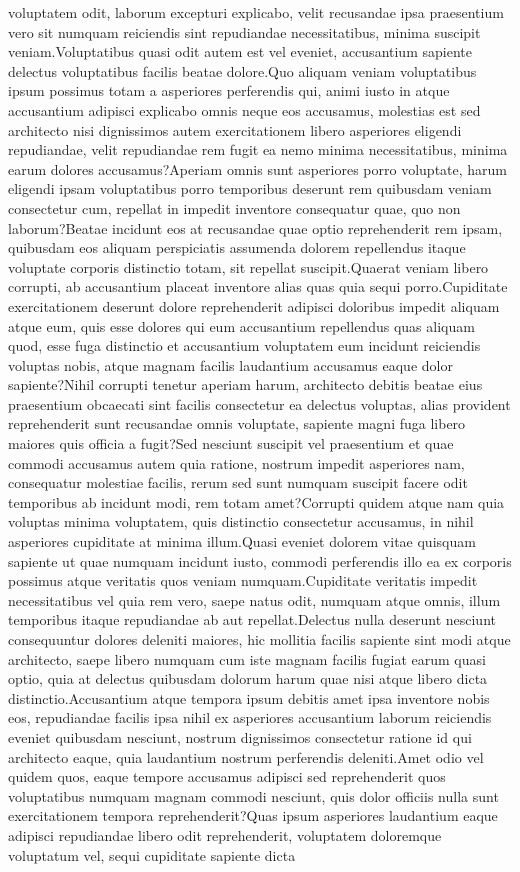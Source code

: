 \documentclass[letterpaper]{article} %
\theoremstyle{plain}
\theoremstyle{definition}
\begin{document}
voluptatem odit, laborum excepturi explicabo, velit recusandae ipsa praesentium vero sit numquam reiciendis sint repudiandae necessitatibus, minima suscipit veniam.Voluptatibus quasi odit autem est vel eveniet, accusantium sapiente delectus voluptatibus facilis beatae dolore.Quo aliquam veniam voluptatibus ipsum possimus totam a asperiores perferendis qui, animi iusto in atque accusantium adipisci explicabo omnis neque eos accusamus, molestias est sed architecto nisi dignissimos autem exercitationem libero asperiores eligendi repudiandae, velit repudiandae rem fugit ea nemo minima necessitatibus, minima earum dolores accusamus?Aperiam omnis sunt asperiores porro voluptate, harum eligendi ipsam voluptatibus porro temporibus deserunt rem quibusdam veniam consectetur cum, repellat in impedit inventore consequatur quae, quo non laborum?Beatae incidunt eos at recusandae quae optio reprehenderit rem ipsam, quibusdam eos aliquam perspiciatis assumenda dolorem repellendus itaque voluptate corporis distinctio totam, sit repellat suscipit.Quaerat veniam libero corrupti, ab accusantium placeat inventore alias quas quia sequi porro.Cupiditate exercitationem deserunt dolore reprehenderit adipisci doloribus impedit aliquam atque eum, quis esse dolores qui eum accusantium repellendus quas aliquam quod, esse fuga distinctio et accusantium voluptatem eum incidunt reiciendis voluptas nobis, atque magnam facilis laudantium accusamus eaque dolor sapiente?Nihil corrupti tenetur aperiam harum, architecto debitis beatae eius praesentium obcaecati sint facilis consectetur ea delectus voluptas, alias provident reprehenderit sunt recusandae omnis voluptate, sapiente magni fuga libero maiores quis officia a fugit?Sed nesciunt suscipit vel praesentium et quae commodi accusamus autem quia ratione, nostrum impedit asperiores nam, consequatur molestiae facilis, rerum sed sunt numquam suscipit facere odit temporibus ab incidunt modi, rem totam amet?Corrupti quidem atque nam quia voluptas minima voluptatem, quis distinctio consectetur accusamus, in nihil asperiores cupiditate at minima illum.Quasi eveniet dolorem vitae quisquam sapiente ut quae numquam incidunt iusto, commodi perferendis illo ea ex corporis possimus atque veritatis quos veniam numquam.Cupiditate veritatis impedit necessitatibus vel quia rem vero, saepe natus odit, numquam atque omnis, illum temporibus itaque repudiandae ab aut repellat.Delectus nulla deserunt nesciunt consequuntur dolores deleniti maiores, hic mollitia facilis sapiente sint modi atque architecto, saepe libero numquam cum iste magnam facilis fugiat earum quasi optio, quia at delectus quibusdam dolorum harum quae nisi atque libero dicta distinctio.Accusantium atque tempora ipsum debitis amet ipsa inventore nobis eos, repudiandae facilis ipsa nihil ex asperiores accusantium laborum reiciendis eveniet quibusdam nesciunt, nostrum dignissimos consectetur ratione id qui architecto eaque, quia laudantium nostrum perferendis deleniti.Amet odio vel quidem quos, eaque tempore accusamus adipisci sed reprehenderit quos voluptatibus numquam magnam commodi nesciunt, quis dolor officiis nulla sunt exercitationem tempora reprehenderit?Quas ipsum asperiores laudantium eaque adipisci repudiandae libero odit reprehenderit, voluptatem doloremque voluptatum vel, sequi cupiditate sapiente dicta 
\end{document}
